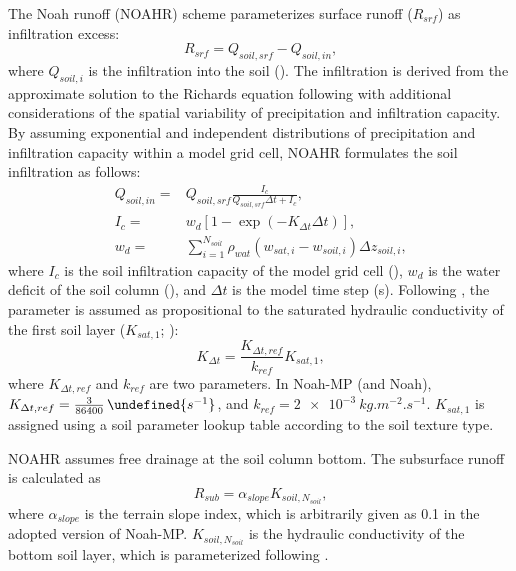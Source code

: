\documentclass[essd, manuscript]{copernicus}
\let\unit\undefined
\begin{document}
The Noah runoff (NOAHR) scheme parameterizes surface runoff (\(R_{srf}\)) as infiltration excess:
\begin{equation}
  R_{srf} = Q_{soil,srf} - Q_{soil,in}
  \text{,}
\end{equation}
where \(Q_{soil,i}\) is the infiltration into the soil (\unit{kg.m^{-2}.s^{-1}}). The infiltration is derived from the approximate solution to the Richards equation following \citet{philip1969AiH} with additional considerations of the spatial variability of precipitation and infiltration capacity. By assuming exponential and independent distributions of precipitation and infiltration capacity within a model grid cell, NOAHR formulates the soil infiltration as follows:
\begin{align}
  Q_{soil,in} = & Q_{soil,srf} \frac{I_c}{Q_{soil,srf} \Delta t + I_c}
  \text{,} \\
  I_{c} =       & w_d [1-\exp(-K_{\Delta t} \Delta t)]
  \text{,} \\
  w_d =         & \sum_{i=1}^{N_{soil}} \rho_{wat} (w_{sat,i} - w_{soil,i}) \Delta z_{soil,i}
  \text{,}
\end{align}
where \(I_{c}\) is the soil infiltration capacity of the model grid cell (\unit{kg.m^{-2}}), \(w_d\) is the water deficit of the soil column (\unit{kg.m^{-2}}), and \(\Delta t\) is the model time step (s). Following \citet{chen2001MWR}, the parameter is assumed as propositional to the saturated hydraulic conductivity of the first soil layer (\(K_{sat,1}\); \unit{kg.m^{-2}.s^{-1}}):
\begin{equation}
  K_{\Delta t} = \frac{K_{\Delta t,ref}}{k_{ref}} K_{sat,1}
  \text{,}
\end{equation}
where \(K_{\Delta t,ref}\) and \(k_{ref}\) are two parameters. In Noah-MP (and Noah), \(K_{\Delta t,ref} = \frac{3}{86400}\,\unit{s^{-1}}\), and \(k_{ref}=\qty{2e-3}{kg.m^{-2}.s^{-1}}\). \(K_{sat,1}\) is assigned using a soil parameter lookup table according to the soil texture type.

NOAHR assumes free drainage at the soil column bottom. The subsurface runoff is calculated as
\begin{equation}
  R_{sub} = \alpha_{slope} K_{soil,N_{soil}} \label{eq:noahr:rsub}
  \text{,}
\end{equation}
where \(\alpha_{slope}\) is the terrain slope index, which is arbitrarily given as 0.1 in the adopted version of Noah-MP\@. \(K_{soil,N_{soil}}\) is the hydraulic conductivity of the bottom soil layer, which is parameterized following \citet{clapp1978WRR}.
\end{document}
